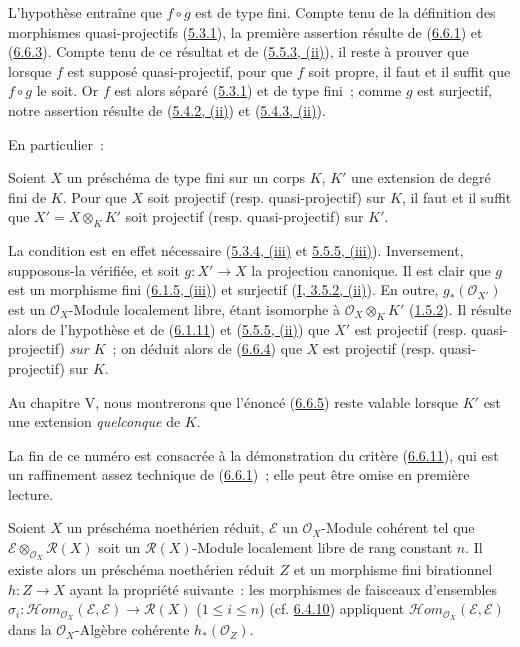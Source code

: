 L'hypothèse entraîne que $f\circ g$ est de type fini. Compte tenu de la
définition des morphismes quasi-projectifs
(\hyperref[II.5.3.1-fr]{5.3.1}), la première assertion résulte de
(\hyperref[II.6.6.1-fr]{6.6.1}) et
(\hyperref[II.6.6.3-fr]{6.6.3}). Compte tenu de ce résultat et de
(\hyperref[II.5.5.3-fr]{5.5.3, (ii)}), il reste à prouver que lorsque $f$ est
supposé quasi-projectif, pour que $f$ soit propre, il faut et il suffit que
$f\circ g$ le soit. Or $f$ est alors séparé
(\hyperref[II.5.3.1-fr]{5.3.1}) et de type fini~; comme $g$ est surjectif,
notre assertion résulte de (\hyperref[II.5.4.2-fr]{5.4.2, (ii)}) et
(\hyperref[II.5.4.3-fr]{5.4.3, (ii)}).

En particulier~:

\begin{corollary}[6.6.5]
\label{II.6.6.5-fr}
Soient $X$ un préschéma de type fini sur un corps $K$, $K'$ une extension de
degré fini de $K$. Pour que $X$ soit projectif (resp. quasi-projectif) sur
$K$, il faut et il suffit que $X'=X\otimes_K K'$ soit projectif (resp.
quasi-projectif) sur $K'$.
\end{corollary}

La condition est en effet nécessaire
(\hyperref[II.5.3.4-fr]{5.3.4, (iii)} et
\hyperref[II.5.5.5-fr]{5.5.5, (iii)}). Inversement, supposons-la vérifiée,
et soit $g:X'\to X$ la projection canonique. Il est clair que $g$ est un
morphisme fini (\hyperref[II.6.1.5-fr]{6.1.5, (iii)}) et surjectif
(\hyperref[I.3.5.2-fr]{I, 3.5.2, (ii)}). En outre,
$g_*(\mathcal{O}_{X'})$ est un $\mathcal{O}_X$-Module localement libre, étant
isomorphe à $\mathcal{O}_X\otimes_K K'$
(\hyperref[II.1.5.2-fr]{1.5.2}). Il résulte alors de l'hypothèse et de
(\hyperref[II.6.1.11-fr]{6.1.11}) et
(\hyperref[II.5.5.5-fr]{5.5.5, (ii)}) que $X'$ est projectif (resp.
quasi-projectif) \emph{sur $K$}~; on déduit alors de
(\hyperref[II.6.6.4-fr]{6.6.4}) que $X$ est projectif (resp.
quasi-projectif) sur $K$.

Au chapitre V, nous montrerons que l'énoncé
(\hyperref[II.6.6.5-fr]{6.6.5}) reste valable lorsque $K'$ est une extension
\emph{quelconque} de $K$.

La fin de ce numéro est consacrée à la démonstration du critère
(\hyperref[II.6.6.11-fr]{6.6.11}), qui est un raffinement assez technique de
(\hyperref[II.6.6.1-fr]{6.6.1})~; elle peut être omise en première lecture.

\begin{lemma}[6.6.6]
\label{II.6.6.6-fr}
Soient $X$ un préschéma noethérien réduit, $\mathcal{E}$ un
$\mathcal{O}_X$-Module cohérent tel que
$\mathcal{E}\otimes_{\mathcal{O}_X}\mathcal{R}(X)$ soit un
$\mathcal{R}(X)$-Module localement libre de rang constant $n$. Il existe
alors un préschéma noethérien réduit $Z$ et un morphisme fini birationnel
$h:Z\to X$ ayant la propriété suivante~: les morphismes de faisceaux
d'ensembles
$\sigma_i:\mathcal{H}om_{\mathcal{O}_X}(\mathcal{E},\mathcal{E})
\to\mathcal{R}(X)$ ($1\leq i\leq n$)
(cf. \hyperref[II.6.4.10-fr]{6.4.10}) appliquent
$\mathcal{H}om_{\mathcal{O}_X}(\mathcal{E},\mathcal{E})$ dans la
$\mathcal{O}_X$-Algèbre cohérente $h_*(\mathcal{O}_Z)$.
\end{lemma}

